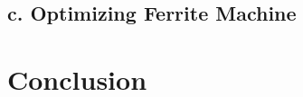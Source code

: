 \documentclass[a4paper, 11pt, titlepage]{article}
\begin{document}
\subsection{c. Optimizing Ferrite Machine}

\section{Conclusion}




















\newpage

 

\end{document}
